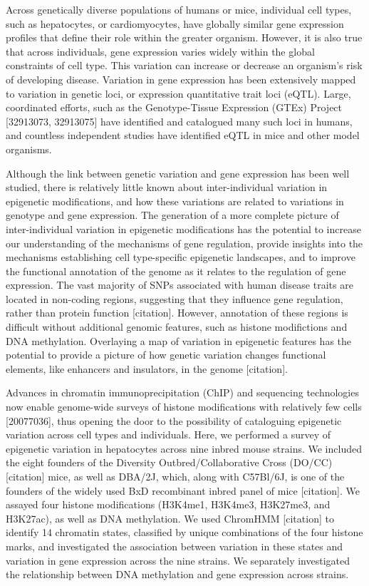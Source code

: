 \documentclass[10pt,letterpaper]{article}
\begin{document}
Across genetically diverse populations of humans or mice, individual
cell types, such as hepatocytes, or cardiomyocytes, have globally
similar gene expression profiles that define their role within the
greater organism. However, it is also true that across individuals, gene
expression varies widely within the global constraints of cell type.
This variation can increase or decrease an organism's risk of developing
disease. Variation in gene expression has been extensively mapped to
variation in genetic loci, or expression quantitative trait loci (eQTL).
Large, coordinated efforts, such as the Genotype-Tissue Expression
(GTEx) Project {[}32913073, 32913075{]} have identified and catalogued
many such loci in humans, and countless independent studies have
identified eQTL in mice and other model organisms.

Although the link between genetic variation and gene expression has been
well studied, there is relatively little known about inter-individual
variation in epigenetic modifications, and how these variations are
related to variations in genotype and gene expression. The generation of
a more complete picture of inter-individual variation in epigenetic
modifications has the potential to increase our understanding of the
mechanisms of gene regulation, provide insights into the mechanisms
establishing cell type-specific epigenetic landscapes, and to improve
the functional annotation of the genome as it relates to the regulation
of gene expression. The vast majority of SNPs associated with human
disease traits are located in non-coding regions, suggesting that they
influence gene regulation, rather than protein function {[}citation{]}.
However, annotation of these regions is difficult without additional
genomic features, such as histone modifictions and DNA methylation.
Overlaying a map of variation in epigenetic features has the potential
to provide a picture of how genetic variation changes functional
elements, like enhancers and insulators, in the genome {[}citation{]}.

Advances in chromatin immunoprecipitation (ChIP) and sequencing
technologies now enable genome-wide surveys of histone modifications
with relatively few cells {[}20077036{]}, thus opening the door to the
possibility of cataloguing epigenetic variation across cell types and
individuals. Here, we performed a survey of epigenetic variation in
hepatocytes across nine inbred mouse strains. We included the eight
founders of the Diversity Outbred/Collaborative Cross (DO/CC)
{[}citation{]} mice, as well as DBA/2J, which, along with C57Bl/6J, is
one of the founders of the widely used BxD recombinant inbred panel of
mice {[}citation{]}. We assayed four histone modifications (H3K4me1,
H3K4me3, H3K27me3, and H3K27ac), as well as DNA methylation. We used
ChromHMM {[}citation{]} to identify 14 chromatin states, classified by
unique combinations of the four histone marks, and investigated the
association between variation in these states and variation in gene
expression across the nine strains. We separately investigated the
relationship between DNA methylation and gene expression across strains.
\end{document}
